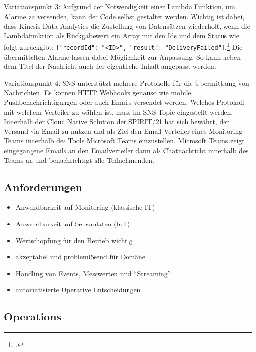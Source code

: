 Variationspunkt 3: Aufgrund der Notwendigkeit einer Lambda Funktion, um Alarme zu versenden, kann der Code selbst gestaltet werden. Wichtig ist dabei, dass Kinesis Data Analytics die Zustellung von Datensätzen wiederholt, wenn die Lambdafunktion als Rückgabewert ein Array mit den Ids und dem Status wie folgt zurückgibt: \texttt{[{"recordId": "<ID>", "result": "DeliveryFailed"}]}.\footcite[Vgl.][]{AmazonWebServicesInc..o.J.ay} Die übermittelten Alarme lassen dabei Möglichkeit zur Anpassung. So kann neben dem Titel der Nachricht auch der eigentliche Inhalt angepasst werden. 

Variationspunkt 4: \ac{SNS} unterstützt mehrere Protokolle für die Übermittlung von Nachrichten. Es können HTTP Webhooks genauso wie mobile Pushbenachrichtigungen oder auch Emails versendet werden. Welches Protokoll mit welchem Verteiler zu wählen ist, muss im \ac{SNS} Topic eingestellt werden. Innerhalb der Cloud Native Solution der SPIRIT/21 hat sich bewährt, den Versand via Email zu nutzen und als Ziel den Email-Verteiler eines Monitoring Teams innerhalb des Tools Microsoft Teams einzustellen. Microsoft Teams zeigt eingegangene Emails an den Emailverteiler dann als Chatnachricht innerhalb des Teams an und benachrichtigt alle Teilnehmenden.

\subsection{Anforderungen}
\begin{itemize}
\item Anwendbarkeit auf Monitoring (klassische IT)
\item Anwendbarkeit auf Sensordaten (\ac{IoT})
\item Wertschöpfung für den Betrieb wichtig
\item akzeptabel und problemlösend für Domäne
\item Handling von Events, Messwerten und \enquote{Streaming}
\item automatisierte Operative Entscheidungen
\end{itemize}

\subsection{Operations}

